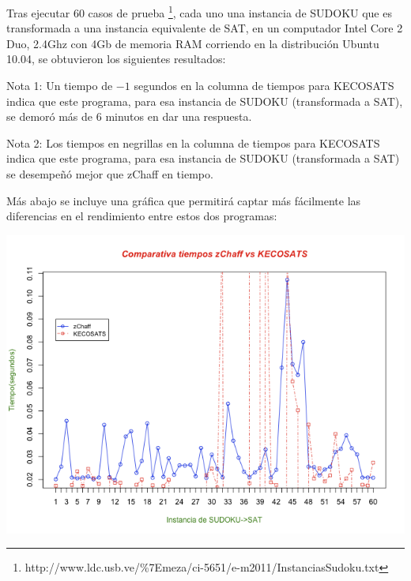 \documentclass[12pt,lettersize,oneside]{article}
\begin{document}
Tras ejecutar $60$ casos de prueba
\footnote{http://www.ldc.usb.ve/\%7Emeza/ci-5651/e-m2011/InstanciasSudoku.txt},
cada uno una instancia de SUDOKU que es transformada a una instancia equivalente
de SAT, en un computador Intel Core 2 Duo, 2.4Ghz con 4Gb de memoria RAM
corriendo en la distribución Ubuntu 10.04, se
obtuvieron los siguientes resultados:

Nota 1: Un tiempo de $-1$ segundos en la columna de tiempos para KECOSATS indica que
este programa, para esa instancia de SUDOKU (transformada a SAT), se demoró más
de $6$ minutos en dar una respuesta.

Nota 2: Los tiempos en negrillas en la columna de tiempos para KECOSATS indica
que este programa, para esa instancia de SUDOKU (transformada a SAT) se
desempeñó mejor que zChaff en tiempo.



Más abajo se incluye una gráfica que permitirá captar más fácilmente las diferencias en el rendimiento entre estos dos programas:
\begin{center}
\includegraphics[scale=0.6]{compare.png}
\end{center}
\end{document}
